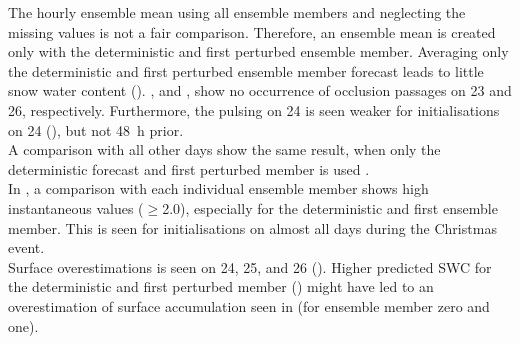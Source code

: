 \noindent
\par\medskip\noindent
The hourly ensemble mean using all ensemble members and neglecting the missing values is not a fair comparison. Therefore, an ensemble mean is created only with the deterministic and first perturbed ensemble member. Averaging only the deterministic and first perturbed ensemble member forecast leads to little snow water content (). ,  and ,  show no occurrence of occlusion passages on \num{23} and \SI{26}{\dec}, respectively. Furthermore, the pulsing on \SI{24}{\dec} is seen weaker for initialisations on \SI{24}{\dec} (), but not \SI{48}{\hour} prior.
\\
A comparison with all other days show the same result, when only the deterministic forecast and first perturbed member is used . 
\\
In , a comparison with each individual ensemble member shows high instantaneous values ($\ge$\SI{2.0}{\SWC}), especially for the deterministic and first ensemble member. This is seen for initialisations on almost all days during the Christmas event. 
\\
Surface overestimations is seen on \num{24}, \num{25}, and \SI{26}{\dec} (). Higher predicted SWC for the deterministic and first perturbed member () might have led to an overestimation of surface accumulation seen in  (for ensemble member zero and one).
